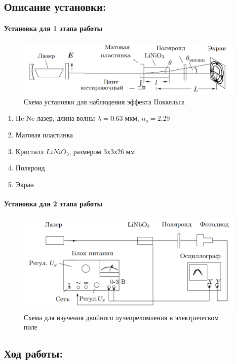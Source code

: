 \documentclass[a4paper,12pt]{article}
\begin{document}
\subsection*{Описание установки:}
\paragraph{Установка для 1 этапа работы}
\begin{figure}[h!]
\centering
\includegraphics[scale=0.45]{setup.png} 
\caption{Схема установки для наблюдения эффекта Поккельса}
\end{figure}
\begin{enumerate}
\itemsep0em
\item He-Ne лазер, длина волны $\lambda = 0.63$ мкм, $n_o=2.29$
\item Матовая пластинка
\item Кристалл $LiNiO_3$, размером 3х3х26$\;\text{мм}$ 
\item Поляроид
\item Экран
\end{enumerate}
\paragraph{Установка для 2 этапа работы}
\begin{figure}[h!]
\centering
\includegraphics[scale=0.4]{setup_0.png} 
\caption{Схема для изучения двойного лучепреломления в электрическом поле}
\end{figure}
\subsection*{Ход работы:}
\end{document}
